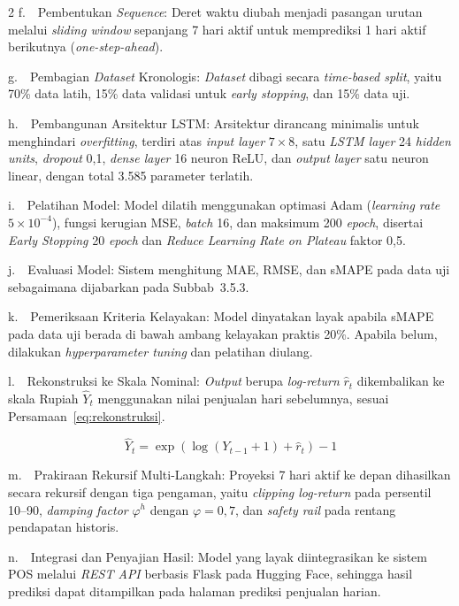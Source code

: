 \documentclass[12pt, a4paper, onecolumn, oneside]{report}
\begin{document}
\begin{spacing}{2}
\noindent f.~~Pembentukan \textit{Sequence}: Deret waktu diubah menjadi pasangan urutan melalui \textit{sliding window} sepanjang 7 hari aktif untuk memprediksi 1 hari aktif berikutnya (\textit{one-step-ahead}).

\noindent g.~~Pembagian \textit{Dataset} Kronologis: \textit{Dataset} dibagi secara \textit{time-based split}, yaitu 70\% data latih, 15\% data validasi untuk \textit{early stopping}, dan 15\% data uji.

\noindent h.~~Pembangunan Arsitektur LSTM: Arsitektur dirancang minimalis untuk menghindari \textit{overfitting}, terdiri atas \textit{input layer} $7 \times 8$, satu \textit{LSTM layer} 24 \textit{hidden units}, \textit{dropout} 0,1, \textit{dense layer} 16 neuron ReLU, dan \textit{output layer} satu neuron linear, dengan total 3.585 parameter terlatih.

\noindent i.~~Pelatihan Model: Model dilatih menggunakan optimasi Adam (\textit{learning rate} $5 \times 10^{-4}$), fungsi kerugian MSE, \textit{batch} 16, dan maksimum 200 \textit{epoch}, disertai \textit{Early Stopping} 20 \textit{epoch} dan \textit{Reduce Learning Rate on Plateau} faktor 0,5.

\noindent j.~~Evaluasi Model: Sistem menghitung MAE, RMSE, dan sMAPE pada data uji sebagaimana dijabarkan pada Subbab~3.5.3.

\noindent k.~~Pemeriksaan Kriteria Kelayakan: Model dinyatakan layak apabila sMAPE pada data uji berada di bawah ambang kelayakan praktis 20\%. Apabila belum, dilakukan \textit{hyperparameter tuning} dan pelatihan diulang.

\noindent l.~~Rekonstruksi ke Skala Nominal: \textit{Output} berupa \textit{log-return} $\hat{r}_t$ dikembalikan ke skala Rupiah $\hat{Y}_t$ menggunakan nilai penjualan hari sebelumnya, sesuai Persamaan~\ref{eq:rekonstruksi}.

\begin{equation}
    \hat{Y}_{t} = \exp\left(\log(Y_{t-1} + 1) + \hat{r}_{t}\right) - 1
    \label{eq:rekonstruksi}
\end{equation}

\noindent m.~~Prakiraan Rekursif Multi-Langkah: Proyeksi 7 hari aktif ke depan dihasilkan secara rekursif dengan tiga pengaman, yaitu \textit{clipping log-return} pada persentil 10--90, \textit{damping factor} $\varphi^h$ dengan $\varphi = 0{,}7$, dan \textit{safety rail} pada rentang pendapatan historis.

\noindent n.~~Integrasi dan Penyajian Hasil: Model yang layak diintegrasikan ke sistem POS melalui \textit{REST API} berbasis Flask pada Hugging Face, sehingga hasil prediksi dapat ditampilkan pada halaman prediksi penjualan harian.


\end{spacing}
\end{document}
